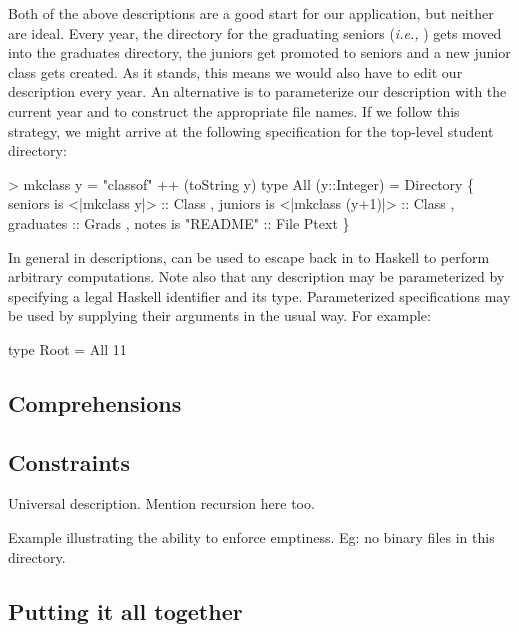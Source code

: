 \documentclass[natbib]{sigplanconf}
\begin{document}
Both of the above descriptions are a good start for our application, but neither
are ideal.  Every year, the directory for the graduating seniors 
({\em i.e.,} ) gets moved into the graduates directory,
the juniors get promoted to seniors and a new junior class gets created.
As it stands, this means we would also have to edit our description every year.
An alternative is to parameterize our description with the current year and
to construct the appropriate file names.  If we follow this strategy,
we might arrive at the following specification for the top-level student directory:
\begin{code}
> mkclass y = "classof" ++ (toString y)
\mbox{}
type All (y::Integer) = Directory
  \{ seniors is <|mkclass y|> :: Class
  , juniors is <|mkclass (y+1)|> :: Class
  , graduates :: Grads
  , notes is "README" :: File Ptext
  \}
\end{code}
In general in descriptions,  can be used to escape back in to
Haskell to perform arbitrary computations.  Note also that any description
may be parameterized by specifying a legal Haskell identifier and its type.
Parameterized specifications may be used by supplying their arguments
in the usual way.  For example:
\begin{code}
type Root = All 11
\end{code}

\subsection{Comprehensions}
\label{sec:comprehensions}

\subsection{Constraints}
\label{sec:constraints}

Universal description.  Mention recursion here too.

Example illustrating the ability to enforce emptiness.  Eg: no binary files in this directory.

\subsection{Putting it all together}
\end{document}
